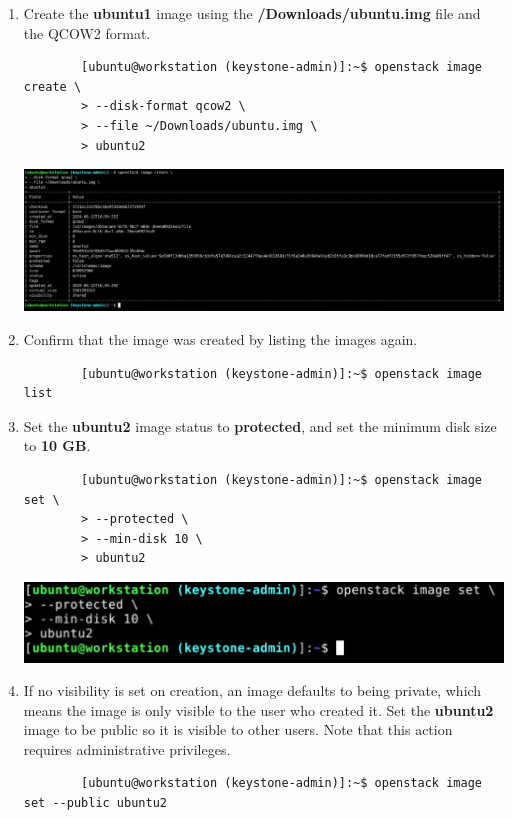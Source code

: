 \documentclass[letterpaper, 12pt]{article}
\begin{document}
\begin{enumerate}
    \item Create the \textbf{ubuntu1} image using the \textbf{\texttildemid/Downloads/ubuntu.img} file and the QCOW2 format.
    \begin{lstlisting}
        [ubuntu@workstation (keystone-admin)]:~$ openstack image create \
        > --disk-format qcow2 \
        > --file ~/Downloads/ubuntu.img \
        > ubuntu2
    \end{lstlisting}

    \begin{center}
        \includegraphics[width=\linewidth]{images/part1/step19.png}
    \end{center}

    \item Confirm that the image was created by listing the images again.
    \begin{lstlisting}
        [ubuntu@workstation (keystone-admin)]:~$ openstack image list
    \end{lstlisting}

    \item Set the \textbf{ubuntu2} image status to \textbf{protected}, and set the minimum disk size to \textbf{10 GB}.
    \begin{lstlisting}
        [ubuntu@workstation (keystone-admin)]:~$ openstack image set \
        > --protected \
        > --min-disk 10 \
        > ubuntu2
    \end{lstlisting}

    \begin{center}
        \includegraphics[width=\linewidth]{images/part1/step21.png}
    \end{center}

    \item If no visibility is set on creation, an image defaults to being private, which means the image is only visible to the user who created it.
    Set the \textbf{ubuntu2} image to be public so it is visible to other users.
    Note that this action requires administrative privileges.
    \begin{lstlisting}
        [ubuntu@workstation (keystone-admin)]:~$ openstack image set --public ubuntu2
    \end{lstlisting}


\end{enumerate}
\end{document}
